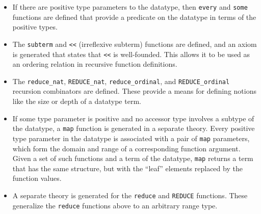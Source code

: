\begin{itemize}
\item If there are positive type parameters to the datatype, then
\texttt{every} and \texttt{some} functions are defined that provide a
predicate on the datatype in terms of the positive types.

\item The \texttt{subterm} and \texttt{<<} (irreflexive subterm) functions
are defined, and an axiom is generated that states that \texttt{<<} is
well-founded.  This allows it to be used as an ordering relation in
recursive function definitions.

\item The \texttt{reduce\_nat}, \texttt{REDUCE\_nat},
\texttt{reduce\_ordinal}, and \texttt{REDUCE\_ordinal} recursion
combinators are defined.  These provide a means for defining notions like
the size or depth of a datatype term.

\item If some type parameter is positive and no accessor type involves a
subtype of the datatype, a \texttt{map} function is generated in a
separate theory.  Every positive type parameter in the datatype is
associated with a pair of \texttt{map} parameters, which form the domain
and range of a corresponding function argument.  Given a set of such
functions and a term of the datatype, \texttt{map} returns a term that has
the same structure, but with the ``leaf'' elements replaced by the
function values.



\item A separate theory is generated for the \texttt{reduce} and
\texttt{REDUCE} functions.  These generalize the \texttt{reduce} functions
above to an arbitrary range type.

\end{itemize}

